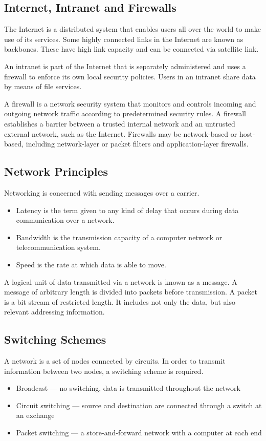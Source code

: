 \subsection{Internet, Intranet and Firewalls}

The Internet is a distributed system that enables users all over the world to make use of its services.
Some highly connected links in the Internet are known as backbones.
These have high link capacity and can be connected via satellite link.

An intranet is part of the Internet that is separately administered and uses a firewall to enforce its own local security policies.
Users in an intranet share data by means of file services.

A firewall is a network security system that monitors and controls incoming and outgoing network traffic according to predetermined security rules.
A firewall establishes a barrier between a trusted internal network and an untrusted external network, such as the Internet.
Firewalls may be network-based or host-based, including network-layer or packet filters and application-layer firewalls.

\subsection{Network Principles}

Networking is concerned with sending messages over a carrier.
\begin{itemize}
  \item Latency is the term given to any kind of delay that occurs during data communication over a network.
  \item Bandwidth is the transmission capacity of a computer network or telecommunication system.
  \item Speed is the rate at which data is able to move.
\end{itemize}

A logical unit of data transmitted via a network is known as a message.
A message of arbitrary length is divided into packets before transmission.
A packet is a bit stream of restricted length.
It includes not only the data, but also relevant addressing information.

\subsection{Switching Schemes}

A network is a set of nodes connected by circuits.
In order to transmit information between two nodes, a switching scheme is required.
\begin{itemize}
  \item Broadcast --- no switching, data is transmitted throughout the network
  \item Circuit switching --- source and destination are connected through a switch at an exchange
  \item Packet switching --- a store-and-forward network with a computer at each end
\end{itemize}

